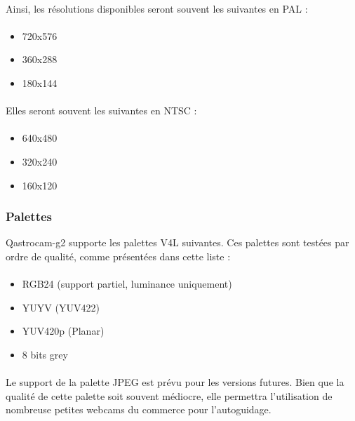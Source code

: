 \documentclass[11pt,a4paper]{book}
\begin{document}
\paragraph*{}
Ainsi, les r\'esolutions disponibles seront souvent les suivantes en PAL :

\paragraph*{}
\begin{itemize}
\item 720x576
\item 360x288
\item 180x144
\end{itemize}

\paragraph*{}
Elles seront souvent les suivantes en NTSC :

\paragraph*{}
\begin{itemize}
\item 640x480
\item 320x240
\item 160x120
\end{itemize}

\subsubsection{Palettes}

Qastrocam-g2 supporte les palettes V4L suivantes. Ces palettes sont test\'ees par ordre de qualit\'e,
comme pr\'esent\'ees dans cette liste :

\paragraph*{}
\begin{itemize}
\item RGB24 (support partiel, luminance uniquement)
\item YUYV (YUV422)
\item YUV420p (Planar)
\item 8 bits grey
\end{itemize}

\paragraph*{}
Le support de la palette JPEG est pr\'evu pour les versions futures. Bien que la qualit\'e
de cette palette soit souvent m\'ediocre, elle permettra l'utilisation de nombreuse petites
webcams du commerce pour l'autoguidage.
\end{document}
